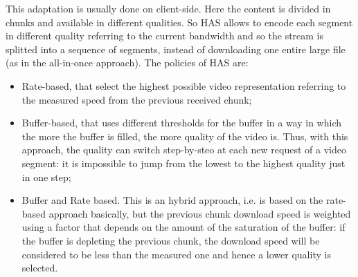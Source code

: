 \documentclass[a4paper]{report}
\begin{document}
This adaptation is usually done on client-side. Here the content is divided in chunks and available in different qualities. So HAS allows to encode each segment in different quality referring to the current bandwidth and so the stream is splitted into a sequence of segments, instead of downloading one entire large file (as in the all-in-once approach). The policies of HAS are:
\begin{itemize}
\item Rate-based, that select the highest possible video representation referring to the measured speed from the previous received chunk;
\item Buffer-based, that uses different thresholds for the buffer in a way in which the more the buffer is filled, the more quality of the video is. Thus, with this approach, the quality can switch step-by-steo at each new request of a video segment: it is impossible to jump from the lowest to the highest quality just in one step;
\item Buffer and Rate based. This is an hybrid approach, i.e. is based on the rate-based approach basically, but the previous chunk download speed is weighted using a factor that depends on the amount of the saturation of the buffer: if the buffer is depleting the previous chunk, the download speed will be considered to be less than the measured one and hence a lower quality is selected. 
\end{itemize}
\end{document}
